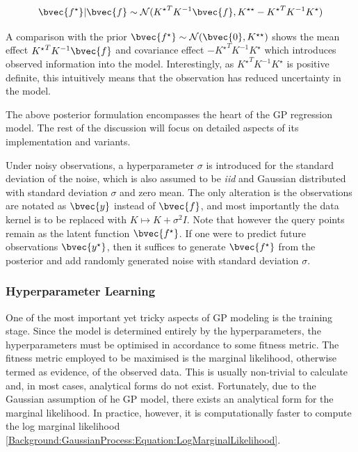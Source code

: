 			\begin{equation}
				\bvec{f^{\star}} | \bvec{f} \sim \mathcal{N}({K^{\star}}^{T} K^{-1} \bvec{f}, K^{\star \star} - {K^{\star}}^{T} K^{-1} K^{\star})
			\label{Background:GaussianProcess:Equation:ConditionalDistribution}
			\end{equation}						
			
			A comparison with the prior $\bvec{f^{\star}} \sim \mathcal{N}(\bvec{0}, K^{\star \star})$ shows the mean effect ${K^{\star}}^{T} K^{-1} \bvec{f}$ and covariance effect $- {K^{\star}}^{T} K^{-1} K^{\star}$ which introduces observed information into the model. Interestingly, as ${K^{\star}}^{T} K^{-1} K^{\star}$ is positive definite, this intuitively means that the observation has reduced uncertainty in the model.
			
			The above posterior formulation encompasses the heart of the GP regression model. The rest of the discussion will focus on detailed aspects of its implementation and variants.
			
			
			Under noisy observations, a hyperparameter $\sigma$ is introduced for the standard deviation of the noise, which is also assumed to be \textit{iid} and Gaussian distributed with standard deviation $\sigma$ and zero mean. The only alteration is the observations are notated as $\bvec{y}$ instead of $\bvec{f}$, and most importantly the data kernel is to be replaced with $K \mapsto K + \sigma^{2} I$. Note that however the query points remain as the latent function $\bvec{f^{\star}}$. If one were to predict future observations $\bvec{y^{\star}}$, then it suffices to generate $\bvec{f^{\star}}$ from the posterior and add randomly generated noise with standard deviation $\sigma$.
				
			\subsubsection{Hyperparameter Learning}
			
				One of the most important yet tricky aspects of GP modeling is the training stage. Since the model is determined entirely by the hyperparameters, the hyperparameters must be optimised in accordance to some fitness metric. The fitness metric employed to be maximised is the marginal likelihood, otherwise termed as evidence, of the observed data. This is usually non-trivial to calculate and, in most cases, analytical forms do not exist. Fortunately, due to the Gaussian assumption of he GP model, there exists an analytical form for the marginal likelihood. In practice, however, it is computationally faster to compute the log marginal likelihood \eqref{Background:GaussianProcess:Equation:LogMarginalLikelihood}.
				
